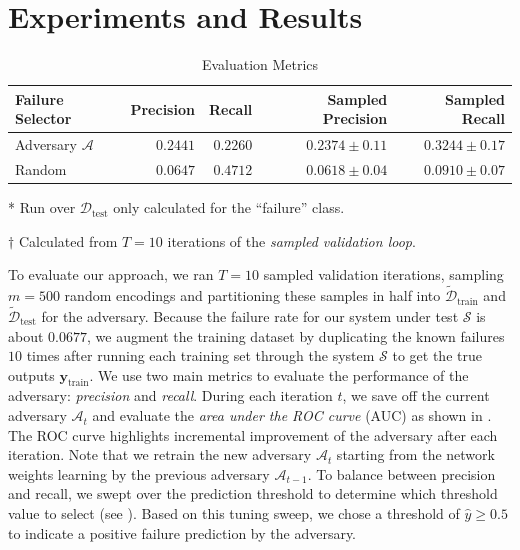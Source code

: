 

\section{Experiments and Results}
\begin{table}[b]
    \centering
    \caption{Evaluation Metrics}\label{tab:metrics}
    \begin{threeparttable}
    \begin{tabular}{@{}lrr|rr@{}}
         \toprule
         \textbf{Failure Selector} &  \textbf{Precision}\tnote{*} & \textbf{Recall}\tnote{*} & \textbf{Sampled Precision}\tnote{$\dagger$} & \textbf{Sampled Recall}\tnote{$\dagger$}\\
         \midrule
         Adversary $\mathcal{A}$ & $0.2441$ & $0.2260$ & $0.2374 \pm 0.11$ & $0.3244 \pm 0.17$ \\
         Random & $0.0647$ & $0.4712$ & $0.0618 \pm 0.04$ & $0.0910 \pm 0.07$ \\
         \bottomrule
    \end{tabular}
    \begin{tablenotes}
        \item[*] {Run over $\mathcal{D}_\text{test}$ only calculated for the ``failure'' class.}
        \item[$\dagger$] {Calculated from $T=10$ iterations of the \textit{sampled validation loop}.}
        \end{tablenotes}
    \end{threeparttable}
\end{table}
To evaluate our approach, we ran $T=10$ sampled validation iterations, sampling $m=500$ random encodings and partitioning these samples in half into $\tilde{\mathcal{D}}_\text{train}$ and $\tilde{\mathcal{D}}_\text{test}$ for the adversary.
Because the failure rate for our system under test $\mathcal{S}$ is about $0.0677$, we augment the training dataset by duplicating the known failures $10$ times after running each training set through the system $\mathcal{S}$ to get the true outputs $\mathbf{y}_\text{train}$.
We use two main metrics to evaluate the performance of the adversary: \textit{precision} and \textit{recall}. During each iteration $t$, we save off the current adversary $\mathcal{A}_t$ and evaluate the \textit{area under the ROC curve} (AUC) as shown in . The ROC curve highlights incremental improvement of the adversary after each iteration. Note that we retrain the new adversary $\mathcal{A}_{t}$ starting from the network weights learning by the previous adversary $\mathcal{A}_{t-1}$.
To balance between precision and recall, we swept over the prediction threshold to determine which threshold value to select (see ).
Based on this tuning sweep, we chose a threshold of $\hat y \ge 0.5$ to indicate a positive failure prediction by the adversary.

